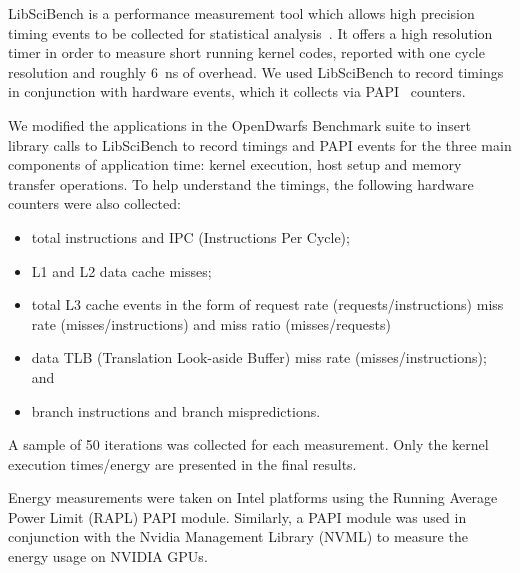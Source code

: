 \documentclass[../document.tex]{subfiles}
\begin{document}
\label{ssec:measurements}

LibSciBench is a performance measurement tool which allows high precision timing events to be collected for statistical analysis~\cite{hoefler2015scientific}.
It offers a high resolution timer in order to measure short running kernel codes, reported with one cycle resolution and roughly \SI{6}{\nano\second} of overhead.
We used LibSciBench to record timings in conjunction with hardware events, which it collects via PAPI~\cite{mucci1999papi} counters.

We modified the applications in the OpenDwarfs Benchmark suite to insert library calls to LibSciBench to record timings and PAPI events for the three main components of application time: kernel execution, host setup and memory transfer operations.
To help understand the timings, the following hardware counters were also collected:
\begin{itemize}
	\item total instructions and IPC (Instructions Per Cycle);
	\item L1 and L2 data cache misses;
	\item total L3 cache events in the form of request rate (requests/instructions) miss rate (misses/instructions) and miss ratio (misses/requests)
	\item data TLB (Translation Look-aside Buffer) miss rate (misses/instructions); and
	\item branch instructions and branch mispredictions.
\end{itemize}

A sample of 50 iterations was collected for each measurement.
Only the kernel execution times/energy are presented in the final results.

Energy measurements were taken on Intel platforms using the Running Average Power Limit (RAPL) PAPI module.
Similarly, a PAPI module was used in conjunction with the Nvidia Management Library (NVML) to measure the energy usage on NVIDIA GPUs.
\end{document}
